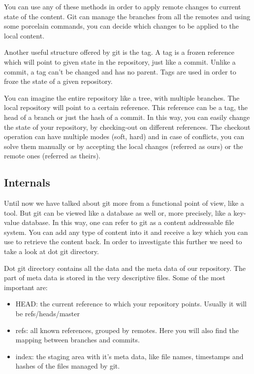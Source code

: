         You can use any of these methods in order to apply remote changes to current state of the content. Git can manage the branches from all the remotes and using some porcelain commands, you can decide which changes to be applied to the local content.
        
        Another useful structure offered by git is the tag. A tag is a frozen reference which will point to given state in the repository, just like a commit. Unlike a commit, a tag can't be changed and has no parent. Tags are used in order to froze the state of a given repository. 
        
        You can imagine the entire repository like a tree, with multiple branches. The local repository will point to a certain reference. This reference can be a tag, the head of a branch or just the hash of a commit. In this way, you can easily change the state of your repository, by checking-out on different references. The checkout operation can have multiple modes (soft, hard) and in case of conflicts, you can solve them manually or by accepting the local changes (referred as ours) or the remote ones (referred as theirs).
        
    \subsection{Internals}
        Until now we have talked about git more from a functional point of view, like a tool. But git can be viewed like a database as well or, more precisely, like a key-value database. In this way, one can refer to git as a content addressable file system. You can add any type of content into it and receive a key which you can use to retrieve the content back. In order to investigate this further we need to take a look at dot git directory.
        
        Dot git directory contains all the data and the meta data of our repository. The part of meta data is stored in the very descriptive files. Some of the most important are:
        
        \begin{itemize}
            \item HEAD: the current reference to which your repository points. Usually it will be refs/heads/master
            \item refs: all known references, grouped by remotes. Here you will also find the mapping between branches and commits.
            \item index: the staging area with it's meta data, like file names, timestamps and hashes of the files managed by git.
        \end{itemize}
        
